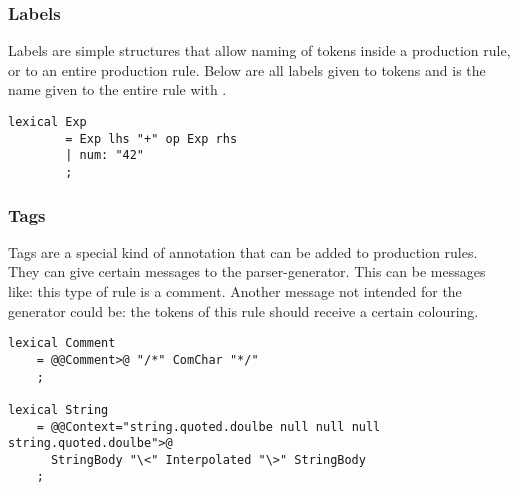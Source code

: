 	\subsubsection{Labels}
	Labels are simple structures that allow naming of tokens inside a production rule, or to an entire production rule. Below are  all labels given to tokens and is  the name given to the entire rule with .
	\begin{lstlisting}[language=RascalGrammar]
	lexical Exp
		= Exp lhs "+" op Exp rhs
		| num: "42"
		;\end{lstlisting}
		
	\subsubsection{Tags}
	Tags are a special kind of annotation that can be added to production rules. They can give certain messages to the parser-generator. This can be messages like: this type of rule is a comment. Another message not intended for the generator could be: the tokens of this rule should receive a certain colouring. 
\begin{lstlisting}[language=RascalGrammar]
lexical Comment
	= @@Comment>@ "/*" ComChar "*/"
	;
	
lexical String
	= @@Context="string.quoted.doulbe null null null string.quoted.doulbe">@
	  StringBody "\<" Interpolated "\>" StringBody
	;\end{lstlisting}	
